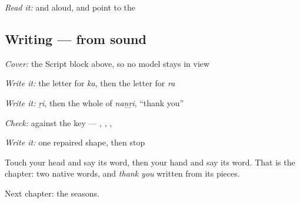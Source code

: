 \emph{Read it:} \textbf{} and \textbf{} aloud, and point to the 

\subsection*{Writing — from sound}
\emph{Cover:} the Script block above, so no model stays in view

\emph{Write it:} the letter for \emph{ka}, then the letter for \emph{ra}

\emph{Write it:} \emph{ṟi}, then the whole of \emph{naṉṟi}, \textquotedblleft{}thank you\textquotedblright{}

\emph{Check:} against the key — \textbf{}, \textbf{}, \textbf{}, \textbf{}

\emph{Write it:} one repaired shape, then stop

\begin{tcolorbox}[breakable,colback=teal!4,colframe=teal!35!black,title={Before you move on}]
Touch your head and say its word, then your hand and say its word. That is the chapter: two native words, and \emph{thank you} written from its pieces.

Next chapter: the seasons.
\end{tcolorbox}
